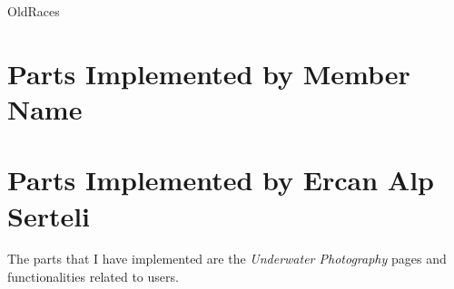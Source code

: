 \documentclass[a4paper,10pt,english]{sphinxmanual}
\begin{document}
\begin{description}

OldRaces


\end{description}


\section{Parts Implemented by Member Name}
\label{user/member3:parts-implemented-by-member-name}\label{user/member3::doc}

\section{Parts Implemented by Ercan Alp Serteli}
\label{user/member4:parts-implemented-by-ercan-alp-serteli}\label{user/member4::doc}
The parts that I have implemented are the \emph{Underwater Photography} pages and functionalities related to users.
\end{document}
